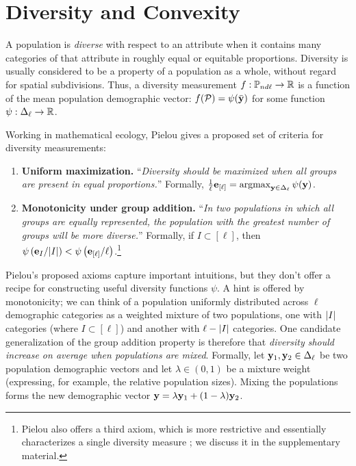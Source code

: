 \section{Diversity and Convexity} \label{sec:diversity-convexity}

A population is \emph{diverse} with respect to an attribute when it contains many categories of that attribute in roughly equal or equitable proportions.
Diversity is usually considered to be a property of a population as a whole, without regard for spatial subdivisions. 
Thus, a diversity measurement $f:\mathbb{P}_{nd\ell} \rightarrow \mathbb{R}$ is a function of the mean population demographic vector: $f(\mathcal{P}) = \psi(\bar{\mathbf{y}})$ for some function $\psi: \Delta_{\ell} \rightarrow \mathbb{R}$.

Working in mathematical ecology, Pielou \cite{pielou1977mathematical} gives a proposed set of criteria for diversity measurements: 
\begin{enumerate}
  \item \textbf{Uniform maximization.} ``\emph{Diversity should be maximized when all groups are present in equal proportions.}'' 
  Formally, $\frac{1}{\ell} \mathbf{e}_{[\ell]} = \operatorname*{argmax}_{\mathbf{y} \in \Delta_{\ell}} \psi(\mathbf{y})$. 
  \item \textbf{Monotonicity under group addition.} ``\emph{In two populations in which all groups are equally represented, the population with the greatest number of groups will be more diverse.}'' 
  Formally, if $I\subset [\ell]$, then $\psi\left( \mathbf{e}_{I}/|I| \right) < \psi\left( \mathbf{e}_{[\ell]}/\ell \right)$.\footnote{Pielou also offers a third axiom, which is more restrictive and essentially characterizes a single diversity measure \cite{chakrabarti2005shannon}; we discuss it in the supplementary material.} 
\end{enumerate}
Pielou's proposed axioms capture important intuitions, but they don't offer a recipe for constructing useful diversity functions $\psi$. 
A hint is offered by monotonicity; we can think of a population uniformly distributed across $\ell$ demographic categories as a weighted mixture of two populations, one with $\left| I \right|$ categories (where $I \subset [\ell]$) and another with $\ell - \left| I \right|$ categories.
One candidate generalization of the group addition property is therefore that \emph{diversity should increase on average when populations are mixed}. 
Formally, let $\mathbf{y}_1, \mathbf{y}_2 \in \Delta_{\ell}$ be two population demographic vectors and let $\lambda \in (0,1)$ be a mixture weight (expressing, for example, the relative population sizes). 
Mixing the populations forms the new demographic vector $\mathbf{y} = \lambda \mathbf{y}_1 + (1-\lambda) \mathbf{y}_2$.

